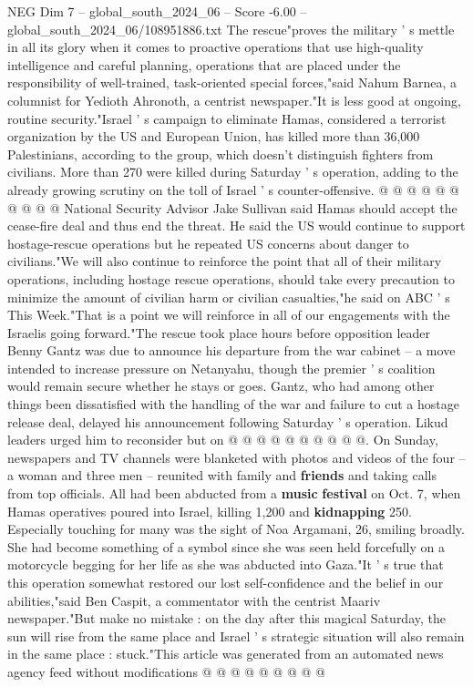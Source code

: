 \begin{textsample}{NEG Dim 7 – global\_south\_2024\_06 – Score -6.00 – global\_south\_2024\_06/108951886.txt}
The rescue"proves the military ' s mettle in all its glory when it comes to proactive operations that use high-quality intelligence and careful planning, operations that are placed under the responsibility of well-trained, task-oriented special forces,"said Nahum Barnea, a columnist for Yedioth Ahronoth, a centrist newspaper."It is less good at ongoing, routine security."Israel ' s campaign to eliminate Hamas, considered a terrorist organization by the US and European Union, has killed more than 36,000 Palestinians, according to the group, which doesn't distinguish fighters from civilians.
More than 270 were killed during Saturday ' s operation, adding to the already growing scrutiny on the toll of Israel ' s counter-offensive. @ @ @ @ @ @ @ @ @ @ National Security Advisor Jake Sullivan said Hamas should accept the cease-fire deal and thus end the threat.
He said the US would continue to support hostage-rescue operations but he repeated US concerns about danger to civilians."We will also continue to reinforce the point that all of their military operations, including hostage rescue operations, should take every precaution to minimize the amount of civilian harm or civilian casualties,"he said on ABC ' s This Week."That is a point we will reinforce in all of our engagements with the Israelis going forward."The rescue took place hours before opposition leader Benny Gantz was due to announce his departure from the war cabinet -- a move intended to increase pressure on Netanyahu, though the premier ' s coalition would remain secure whether he stays or goes.
Gantz, who had among other things been dissatisfied with the handling of the war and failure to cut a hostage release deal, delayed his announcement following Saturday ' s operation.
Likud leaders urged him to reconsider but on @ @ @ @ @ @ @ @ @ @.
On Sunday, newspapers and TV channels were blanketed with photos and videos of the four -- a woman and three men -- reunited with family and \textbf{friends} and taking calls from top officials.
All had been abducted from a \textbf{music} \textbf{festival} on Oct. 7, when Hamas operatives poured into Israel, killing 1,200 and \textbf{kidnapping} 250.
Especially touching for many was the sight of Noa Argamani, 26, smiling broadly.
She had become something of a symbol since she was seen held forcefully on a motorcycle begging for her life as she was abducted into Gaza."It ' s true that this operation somewhat restored our lost self-confidence and the belief in our abilities,"said Ben Caspit, a commentator with the centrist Maariv newspaper."But make no mistake : on the day after this magical Saturday, the sun will rise from the same place and Israel ' s strategic situation will also remain in the same place : stuck."This article was generated from an automated news agency feed without modifications @ @ @ @ @ @ @ @ @

\end{textsample}
